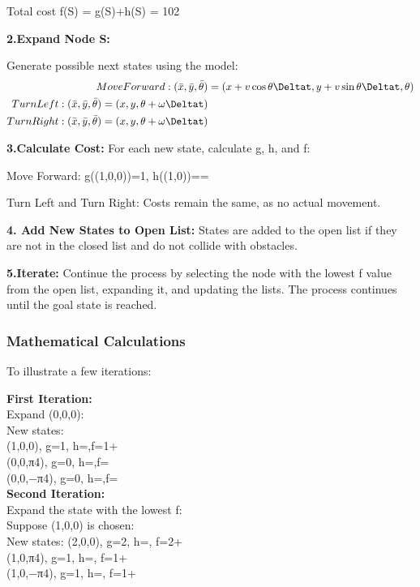 \documentclass[9pt,a4paper,twoside]{rho-class/rho}
\begin{document}
        Total cost f(S) = g(S)+h(S) = 102 

   \textbf{ 2.Expand Node S:}
   
    Generate possible next states using the model: 
    \begin{align*}
         Move Forward : (\Bar{x},\Bar{y},\Bar{\theta})& = (x+v\cos{\theta}\Deltat,y+v\sin{\theta}\Deltat,\theta)\\
         Turn Left : (\Bar{x},\Bar{y},\Bar{\theta}) = (x,y,\theta+\omega\Deltat)\\
         Turn Right : (\Bar{x},\Bar{y},\Bar{\theta}) = (x,y,\theta+\omega\Deltat)
     \end{align*}

    \textbf{3.Calculate Cost:}
    For each new state, calculate g, h, and f:
    
        Move Forward: g((1,0,0))=1, h((1,0))==
        
        Turn Left and Turn Right: Costs remain the same, as no actual movement.

    \textbf{4. Add New States to Open List:}
        States are added to the open list if they are not in the closed list and do not collide with obstacles.

   \textbf{ 5.Iterate:}
        Continue the process by selecting the node with the lowest f value from the open list, expanding it, and updating the lists.
        The process continues until the goal state is reached.

    \subsubsection{Mathematical Calculations}
    To illustrate a few iterations:
    
         \textbf{First Iteration:}\\
    Expand (0,0,0):\\
    New states: \\
    (1,0,0),       g=1, h=,f=1+\\
    (0,0,π4),      g=0, h=,f=\\
    (0,0,−π4),     g=0, h=,f=\\
    
        \textbf{Second Iteration:}\\
    Expand the state with the lowest f:\\
    Suppose (1,0,0) is chosen:\\
    New states: 
    (2,0,0),      g=2, h=, f=2+\\
    (1,0,π4),     g=1, h=, f=1+\\
    (1,0,−π4),    g=1, h=, f=1+
    
\end{document}
